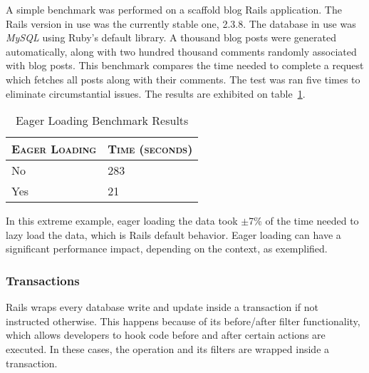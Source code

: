 A simple benchmark was performed on a scaffold blog Rails application. The Rails version in use was the currently stable one, 2.3.8. The database in use was \textit{MySQL} using Ruby's default library. A thousand blog posts were generated automatically, along with two hundred thousand comments randomly associated with blog posts. This benchmark compares the time needed to complete a request which fetches all posts along with their comments. The test was ran five times to eliminate circumstantial issues. The results are exhibited on table~\ref{tab:eager_loading}.
\begin{table}[ht]
  \centering
  
  \begin{tabular}{l|l}
    \textsc{Eager Loading}
  & \textsc{Time (seconds)} \\
  \hline
  No & 283 \\
  Yes & 21 \\
  
  \end{tabular}
  \caption{Eager Loading Benchmark Results}
  \label{tab:eager_loading}
\end{table}
In this extreme example, eager loading the data took $\pm$7\% of the time needed to lazy load the data, which is Rails default behavior. Eager loading can have a significant performance impact, depending on the context, as exemplified.

\subsubsection{Transactions}
Rails wraps every database write and update inside a transaction if not instructed otherwise. This happens because of its before/after filter functionality, which allows developers to hook code before and after certain actions are executed. In these cases, the operation and its filters are wrapped inside a transaction.


